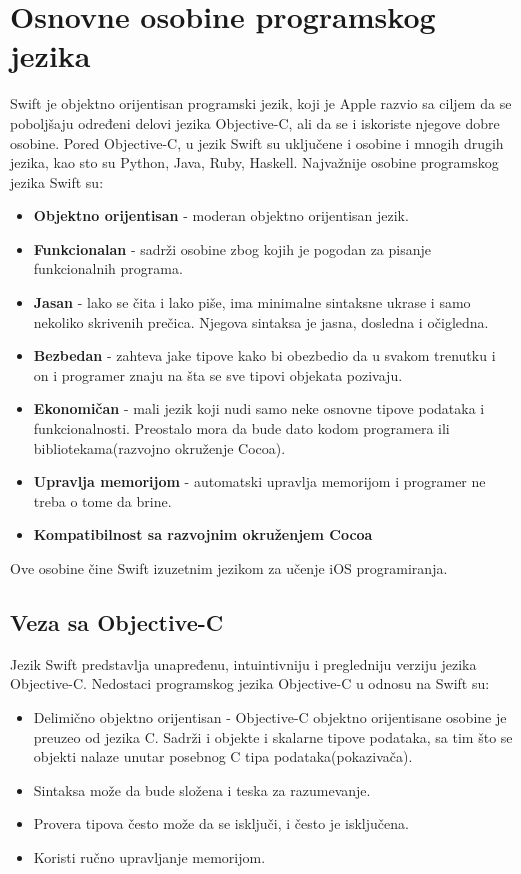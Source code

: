 \documentclass[a4paper]{article}
\begin{document}
\section{Osnovne osobine programskog jezika}	
\label{sec:treciDeo}

Swift je objektno orijentisan programski jezik, koji je Apple razvio sa ciljem da 
se poboljšaju određeni delovi jezika Objective-C, ali da se i iskoriste njegove
dobre osobine. Pored Objective-C, u jezik Swift su uključene i osobine i mnogih drugih jezika,
kao sto su Python, Java, Ruby, Haskell. Najvažnije osobine programskog jezika Swift su:
\begin{itemize}
\item\textbf{Objektno orijentisan} - moderan objektno orijentisan jezik.
\item\textbf{Funkcionalan} - sadrži osobine zbog kojih je pogodan za pisanje funkcionalnih programa.
\item\textbf{Jasan} - lako se čita i lako piše, ima minimalne sintaksne ukrase i samo nekoliko skrivenih prečica. Njegova sintaksa je jasna, dosledna i očigledna.
\item\textbf{Bezbedan} - zahteva jake tipove kako bi obezbedio da u svakom trenutku i on i programer znaju na šta se sve tipovi objekata pozivaju.
\item\textbf{Ekonomičan} - mali jezik koji nudi samo neke osnovne tipove podataka i funkcionalnosti. Preostalo mora da bude dato kodom programera ili bibliotekama(razvojno okruženje Cocoa).
\item\textbf{Upravlja memorijom} - automatski upravlja memorijom i programer ne treba o tome da brine.
\item\textbf{Kompatibilnost sa razvojnim okruženjem Cocoa}
\end{itemize}

Ove osobine čine Swift izuzetnim jezikom za učenje iOS programiranja.


\subsection{Veza sa Objective-C}
\label{subsec:podnaslovVeza}

Jezik Swift predstavlja unapređenu, intuintivniju i pregledniju verziju jezika Objective-C.
Nedostaci programskog jezika Objective-C u odnosu na Swift su:
\begin{itemize}
\item Delimično objektno orijentisan - Objective-C objektno orijentisane osobine je preuzeo od 		      jezika C. Sadrži i objekte i skalarne tipove podataka, sa tim što se objekti 
	  nalaze unutar posebnog C tipa podataka(pokazivača).
\item Sintaksa može da bude složena i teska za razumevanje.
\item Provera tipova često može da se isključi, i često je isključena.
\item Koristi ručno upravljanje memorijom.
\end{itemize}
\end{document}
